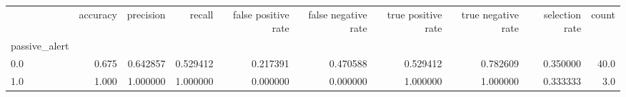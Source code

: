 \begin{tabular}{lrrrrrrrrr}
\toprule
{} &  accuracy &  precision &    recall &  false positive rate &  false negative rate &  true positive rate &  true negative rate &  selection rate &  count \\
passive\_alert &           &            &           &                      &                      &                     &                     &                 &        \\
\midrule
0.0           &     0.675 &   0.642857 &  0.529412 &             0.217391 &             0.470588 &            0.529412 &            0.782609 &        0.350000 &   40.0 \\
1.0           &     1.000 &   1.000000 &  1.000000 &             0.000000 &             0.000000 &            1.000000 &            1.000000 &        0.333333 &    3.0 \\
\bottomrule
\end{tabular}
